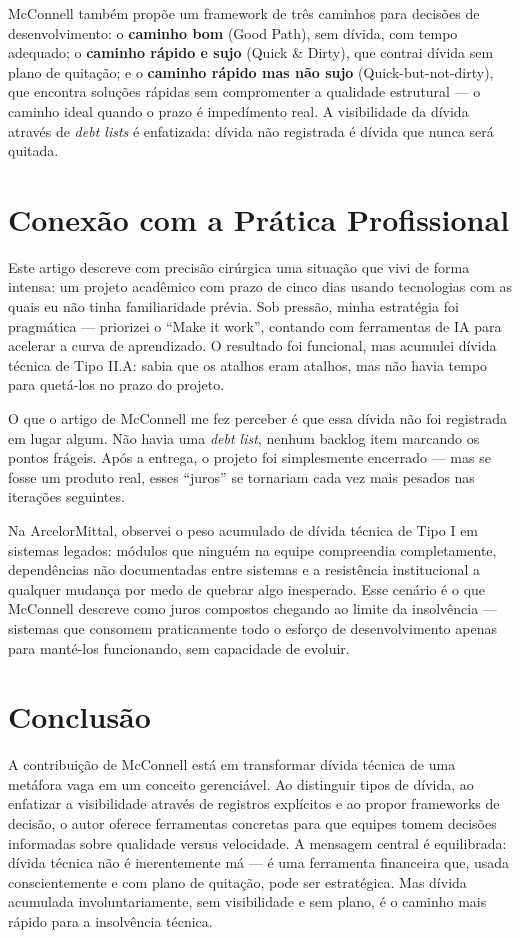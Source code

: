 \documentclass[12pt,a4paper]{article}
\begin{document}
McConnell tamb\'em prop\~oe um framework de tr\^es caminhos para decis\~oes de
desenvolvimento: o \textbf{caminho bom} (Good Path), sem d\'ivida, com tempo
adequado; o \textbf{caminho r\'apido e sujo} (Quick \& Dirty), que contrai d\'ivida
sem plano de quitação; e o \textbf{caminho r\'apido mas n\~ao sujo} (Quick-but-not-dirty),
que encontra solu\c{c}\~oes r\'apidas sem compromenter a qualidade estrutural ---
o caminho ideal quando o prazo \'e imped\'imento real. A visibilidade da d\'ivida
atrav\'es de \textit{debt lists} \'e enfatizada: d\'ivida n\~ao registrada \'e
d\'ivida que nunca ser\'a quitada.

\section{Conex\~ao com a Pr\'atica Profissional}

Este artigo descreve com precis\~ao cir\'urgica uma situa\c{c}\~ao que vivi de
forma intensa: um projeto acad\^emico com prazo de cinco dias usando tecnologias
com as quais eu n\~ao tinha familiaridade pr\'evia. Sob press\~ao, minha estrat\'egia
foi pragm\'atica --- priorizei o ``Make it work'', contando com ferramentas de
IA para acelerar a curva de aprendizado. O resultado foi funcional, mas acumulei
d\'ivida t\'ecnica de Tipo II.A: sabia que os atalhos eram atalhos, mas n\~ao
havia tempo para quet\'a-los no prazo do projeto.

O que o artigo de McConnell me fez perceber \'e que essa d\'ivida n\~ao foi
registrada em lugar algum. N\~ao havia uma \textit{debt list}, nenhum backlog
item marcando os pontos fr\'ageis. Ap\'os a entrega, o projeto foi simplesmente
encerrado --- mas se fosse um produto real, esses ``juros'' se tornariam cada
vez mais pesados nas itera\c{c}\~oes seguintes.

Na ArcelorMittal, observei o peso acumulado de d\'ivida t\'ecnica de Tipo I em
sistemas legados: m\'odulos que ningu\'em na equipe compreendia completamente,
depend\^encias n\~ao documentadas entre sistemas e a resist\^encia institucional
a qualquer mudan\c{c}a por medo de quebrar algo inesperado. Esse cen\'ario \'e
o que McConnell descreve como juros compostos chegando ao limite da insolvência
--- sistemas que consomem praticamente todo o esfor\c{c}o de desenvolvimento
apenas para mant\'e-los funcionando, sem capacidade de evoluir.

\section{Conclus\~ao}

A contribui\c{c}\~ao de McConnell est\'a em transformar d\'ivida t\'ecnica de
uma metáfora vaga em um conceito gerenci\'avel. Ao distinguir tipos de d\'ivida,
ao enfatizar a visibilidade atrav\'es de registros expl\'icitos e ao propor
frameworks de decis\~ao, o autor oferece ferramentas concretas para que equipes
tomem decis\~oes informadas sobre qualidade versus velocidade. A mensagem central
\'e equilibrada: d\'ivida t\'ecnica n\~ao \'e inerentemente m\'a --- \'e uma
ferramenta financeira que, usada conscientemente e com plano de quitação, pode
ser estrat\'egica. Mas d\'ivida acumulada involuntariamente, sem visibilidade e
sem plano, \'e o caminho mais r\'apido para a insolv\^encia t\'ecnica.
\end{document}
